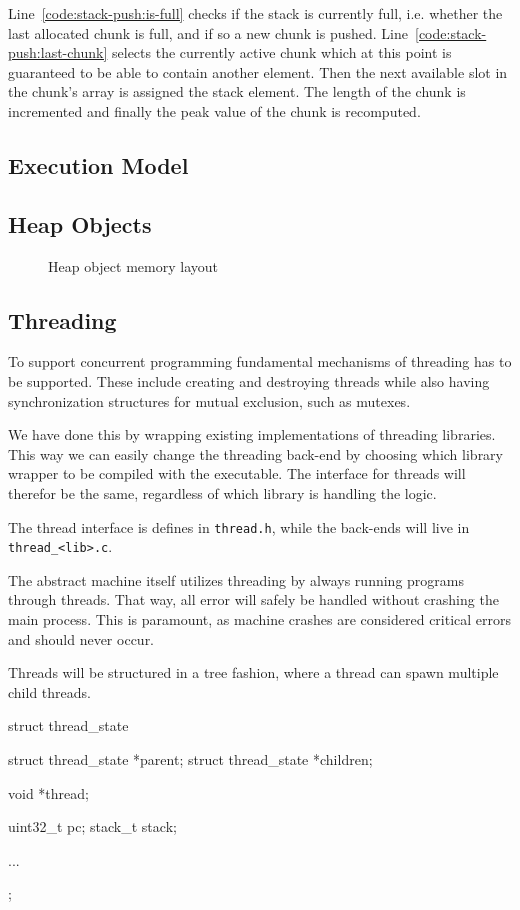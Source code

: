 Line~\ref{code:stack-push:is-full} checks if the stack is currently full,
i.e. whether the last allocated chunk is full, and if so a new chunk is
pushed. Line~\ref{code:stack-push:last-chunk} selects the currently active chunk
which at this point is guaranteed to be able to contain another element. Then
the next available slot in the chunk's  array is assigned the
stack element. The length of the chunk is incremented and finally the peak value
of the chunk is recomputed.

\subsection{Execution Model}


\subsection{Heap Objects}

\begin{figure}[H]
  \centering
  
  \caption{Heap object memory layout}
\end{figure}


\subsection{Threading}

To support concurrent programming fundamental mechanisms of threading has to be
supported. These include creating and destroying threads while also having
synchronization structures for mutual exclusion, such as mutexes.

We have done this by wrapping existing implementations of threading libraries.
This way we can easily change the threading back-end by choosing which library
wrapper to be compiled with the executable. The interface for threads will
therefor be the same, regardless of which library is handling the logic.

The thread interface is defines in {\tt thread.h}, while the back-ends will live
in {\tt thread\_<lib>.c}.

The abstract machine itself utilizes threading by always running programs
through threads. That way, all error will safely be handled without crashing the
main process. This is paramount, as machine crashes are considered critical
errors and should never occur.

Threads will be structured in a tree fashion, where a thread can spawn multiple
child threads.
\begin{ccode}
struct thread_state {
    struct thread_state *parent;
    struct thread_state *children;

    void *thread;

    uint32_t pc;
    stack_t stack;

    ...
};
\end{ccode}

